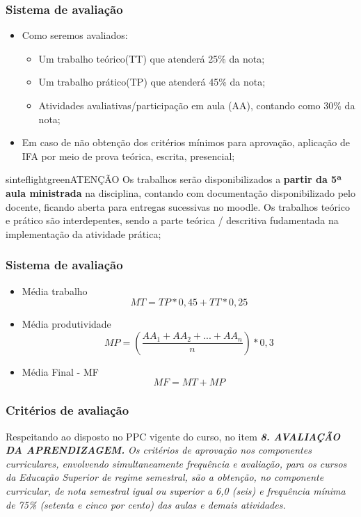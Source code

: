 \documentclass{beamer}
\begin{document}
\begin{frame}[fragile]\justifying
\frametitle{Sistema de avaliação}
\begin{itemize}
            
            \item Como seremos avaliados:
            \begin{itemize}
                  \item Um trabalho teórico(TT) que atenderá 25\% da nota;
                  \item Um trabalho prático(TP) que atenderá 45\% da nota;
                  \item Atividades avaliativas/participação em aula (AA), contando como 30\% da nota;
            \end{itemize}
            \item Em caso de não obtenção dos critérios mínimos para aprovação, aplicação de IFA por meio de prova teórica, escrita, presencial;
\end{itemize}
\begin{colorblock}[black]{sinteflightgreen}{ATENÇÃO}
      Os trabalhos serão disponibilizados a \textbf{partir da 5ª aula ministrada} na disciplina, contando com documentação disponibilizado pelo docente, ficando aberta para entregas sucessivas no moodle.
      Os trabalhos teórico e prático são interdepentes, sendo a parte teórica / descritiva fudamentada na implementação da atividade prática;
\end{colorblock}

\end{frame}

\begin{frame}[fragile]\justifying
      \frametitle{Sistema de avaliação}
      \begin{itemize}
            \item Média trabalho \[ MT = TP * 0,45 + TT * 0,25\]
            \item Média produtividade \[ MP = \left ( \frac{AA_1 + AA_2 + ... + AA_n}n \right ) * 0,3 \]
            \item Média Final - MF \[MF = MT + MP\]
      \end{itemize}
      
      \end{frame}


\begin{frame}[fragile]\justifying
      \frametitle{Critérios de avaliação}
      Respeitando ao disposto no PPC vigente do curso, no item \textbf{\textit{8. AVALIAÇÃO DA APRENDIZAGEM. }}
      \newline
      \newline
      \textit{Os critérios de aprovação nos componentes curriculares, envolvendo simultaneamente frequência e avaliação, para os cursos da Educação Superior de 
      regime semestral, são a obtenção, no componente curricular, de nota semestral igual ou superior a 6,0 (seis) e frequência mínima de 75\% (setenta e cinco por cento) das
      aulas e demais atividades. }
\end{frame}
\end{document}
